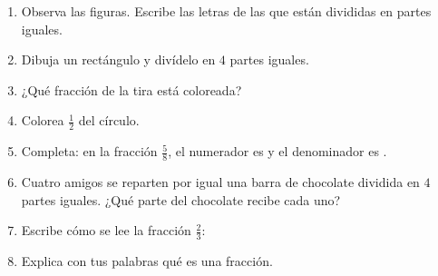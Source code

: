 \begin{wbreview}
\begin{enumerate}
\item Observa las figuras. Escribe las letras de las que están divididas en partes iguales.

\begin{center}
\end{center}


\item Dibuja un rectángulo y divídelo en $4$ partes iguales.

\wbbox[3cm]

\item ¿Qué fracción de la tira está coloreada?

\begin{center}
\end{center}

\wbfracbox

\item Colorea $\frac{1}{2}$ del círculo.


\item Completa: en la fracción $\frac{5}{8}$, el numerador es \wbblank y el denominador es \wbblank.

\item Cuatro amigos se reparten por igual una barra de chocolate dividida en $4$ partes iguales. ¿Qué parte del chocolate recibe cada uno? \wbblank[3cm]

\item Escribe cómo se lee la fracción $\frac{2}{3}$: \wbblank[4cm]

\item Explica con tus palabras qué es una fracción.

\end{enumerate}
\end{wbreview}
